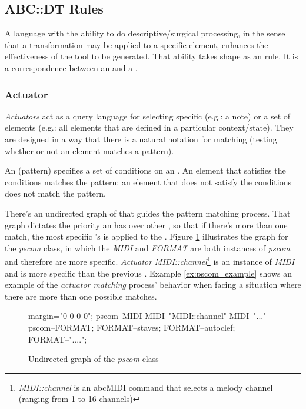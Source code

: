 \subsection{ABC::DT Rules}
\label{sec:abcdt_rules}

A language with the ability to do descriptive/surgical processing, in the sense that a
transformation may be applied to a specific element, enhances the effectiveness of the tool to be
generated. That ability takes shape as an \abcdt{} rule. It is a correspondence between an
\actuator{} and a \transformation{}.

\subsubsection{Actuator}

\emph{Actuators} act as a query language for selecting specific \abcelements{} (e.g.: a note) or a
set of elements (e.g.: all elements that are defined in a particular context/state). They are
designed in a way that there is a natural notation for matching (testing whether or not an \abc{}
element matches a pattern).

An \actuator{} (pattern) specifies a set of conditions on an \abcelement{}. An element that
satisfies the conditions matches the pattern; an element that does not satisfy the conditions does
not match the pattern.

There's an undirected graph of \abcelements{} that guides the pattern matching process. That graph
dictates the priority an \actuator{} has over other \actuators{}, so that if there's more than one
match, the most specific \actuator{}'s \transformation{} is applied to the \abcelement{}. Figure
\ref{fig:pscom} illustrates the graph for the \emph{pscom} class, in which the \actuators{}
\emph{MIDI} and \emph{FORMAT} are both instances of \emph{pscom} and therefore are more specific.
\emph{Actuator} \emph{MIDI::channel}\footnote{\emph{MIDI::channel} is an abcMIDI command that
selects a melody channel (ranging from 1 to 16 channels)} is an instance of \emph{MIDI} and is more
specific than the previous \actuators{}. Example \ref{ex:pscom_example} shows an example of the
\emph{actuator matching} process' behavior when facing a situation where there are more than one
possible matches.\\

\begin{figure}[h!]
  \centering
  {
    margin="0 0 0 0";
    pscom--MIDI
    MIDI--"MIDI::channel"
    MIDI--"..."
    pscom--FORMAT;
    FORMAT--staves;
    FORMAT--autoclef;
    FORMAT--"....";
  }
  \caption{ Undirected graph of the \emph{pscom} class }
  \label{fig:pscom}
\end{figure}

